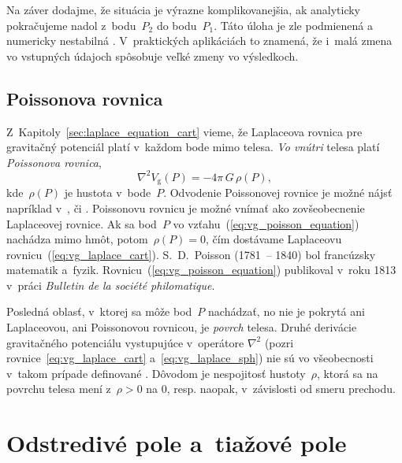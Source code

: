 \documentclass[a4paper, 12pt]{book}
\newcommand{\gidx}{\mathrm g}
\begin{document}
Na záver dodajme, že situácia je výrazne komplikovanejšia, ak analyticky 
pokračujeme nadol z~bodu~$P_2$ do bodu~$P_1$.  Táto úloha je zle podmienená 
a numericky nestabilná \parencite{SansoGeodeticBoundaryValueProblem}.  
V~praktických aplikáciách to znamená, že i~malá zmena vo vstupných údajoch 
spôsobuje veľké zmeny vo výsledkoch.






\subsection{Poissonova rovnica}
\label{sec:poisson_equation}

Z~Kapitoly~\ref{sec:laplace_equation_cart} vieme, že Laplaceova rovnica pre
gravitačný potenciál platí v~každom bode mimo telesa.  \emph{Vo vnútri} telesa
platí \emph{Poissonova rovnica},
%
\begin{equation}
\label{eq:vg_poisson_equation}
\nabla^2 V_\gidx(P) = -4 \pi \, G \, \rho(P){,}
\end{equation}
%
kde~$\rho(P)$ je hustota v~bode~$P$.  Odvodenie Poissonovej rovnice je možné 
nájsť napríklad v~\textcite{MacMillan1930}, \textcite{Kellogg1967} či 
\textcite{SansoGeoidDetermination}.  Poissonovu rovnicu je možné vnímať ako 
zovšeobecnenie Laplaceovej rovnice.  Ak sa bod~$P$ vo 
vzťahu~(\ref{eq:vg_poisson_equation}) nachádza mimo hmôt, potom~$\rho(P) = 0$, 
čím dostávame Laplaceovu rovnicu~(\ref{eq:vg_laplace_cart}).  S.~D.~Poisson 
(1781~-- 1840) bol francúzsky matematik a~fyzik.  
Rovnicu~(\ref{eq:vg_poisson_equation}) publikoval v~roku 1813 v~práci 
\textit{Bulletin de la société philomatique}.

Posledná oblasť, v~ktorej sa môže bod~$P$ nachádzať, no nie je pokrytá ani 
Laplaceovou, ani Poissonovou rovnicou, je \emph{povrch} telesa.  Druhé 
derivácie gravitačného potenciálu vystupujúce v~operátore $\nabla^2$ (pozri 
rovnice~\ref{eq:vg_laplace_cart} a~\ref{eq:vg_laplace_sph}) nie sú vo 
všeobecnosti v~takom prípade definované \parencite{Kellogg1967}.  Dôvodom je 
nespojitosť hustoty~$\rho$, ktorá sa na povrchu telesa mení z~$\rho > 0$ na 0, 
resp. naopak, v~závislosti od smeru prechodu.






\section{Odstredivé pole a~tiažové pole}
\label{sec:centrifugal_gravity_field}
\end{document}
